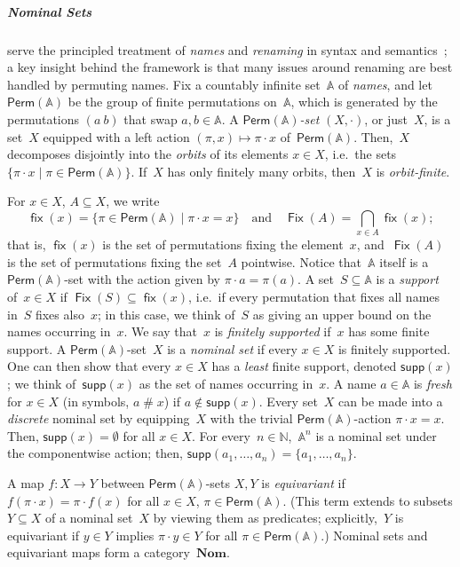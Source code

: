 \documentclass[a4paper,UKenglish,cleveref,thm-restate,numberwithinsect,final]{lipics-v2021}
\newcommand{\Perm}{\mathsf{Perm}(\Names)}
\newcommand{\Names}{\mathbb{A}}
\newcommand{\fresh}{\mathbin{\#}}
\newcommand{\supp}{\mathsf{supp}}
\newcommand{\fix}{\mathop{\mathsf{fix}}}
\newcommand{\Fix}{\mathop{\mathsf{Fix}}}
\theoremstyle{plain}
\numberwithin{equation}{section}
\newcommand{\Nat}{{\mathbb{N}}}
\newcommand{\+}[1]{\mathcal{#1}\xspace}
\newcommand{\Nom}{\mathbf{Nom}}
\theoremstyle{definition}
\begin{document}
\subparagraph*{Nominal Sets} serve the principled treatment of
\emph{names} and \emph{renaming} in syntax and
semantics~\cite{Pitts13}; a key insight behind the framework is that many
issues around renaming are best handled by permuting names. Fix a
countably infinite set~$\Names$ of \emph{names}, and let~$\Perm$ be
the group of finite permutations on~$\Names$, which is generated by the permutations $(a\ b)$ that
swap $a,b\in\Names$. A \emph{$\Perm$-set} $(X,{\cdot})$, or just~$X$,
is a set~$X$ equipped with a left action $(\pi,x)\mapsto \pi\cdot x$
of~$\Perm$. Then,~$X$ decomposes disjointly into the \emph{orbits} of
its elements $x\in X$, i.e.~the sets $\{\pi\cdot x\mid\pi\in
\Perm\}$. If~$X$ has only finitely many orbits, then~$X$ is
\emph{orbit-finite}.

For $x\in X$, $A\subseteq X$,
we write
\begin{equation*}\textstyle
  \fix(x)=\{\pi\in \Perm\mid \pi\cdot x=x\}\quad\text{and}\quad
  \Fix(A)=\bigcap_{x\in A}\fix(x);
\end{equation*}
that is, $\fix(x)$ is the set of permutations fixing the element~$x$,
and~$\Fix(A)$ is the set of permutations fixing the set~$A$ pointwise.
Notice that~$\Names$ itself is a $\Perm$-set with the action given by
$\pi\cdot a=\pi(a)$. A set~$S\subseteq\Names$ is a \emph{support}
of~$x\in X$ if $\Fix(S)\subseteq\fix(x)$, i.e.~if every permutation
that fixes all names in~$S$ fixes also~$x$; in this case, we think
of~$S$ as giving an upper bound on the names occurring in~$x$. We say
that~$x$ is \emph{finitely supported} if~$x$ has some finite support.
A $\Perm$-set~$X$ is a \emph{nominal set} if every $x\in X$ is
finitely supported. One can then show that every $x\in X$ has a
\emph{least} finite support, denoted $\supp(x)$; we think
of~$\supp(x)$ as the set of names occurring in~$x$. A name
$a\in\Names$ is \emph{fresh} for $x\in X$ (in symbols, $a\fresh x$) if
$a\notin\supp(x)$. Every set~$X$ can be made into a \emph{discrete}
nominal set by equipping~$X$ with the trivial $\Perm$-action
$\pi\cdot x=x$. Then, $\supp(x)=\emptyset$ for all $x\in X$. For
every~$n\in\Nat$,~$\Names^n$ is a nominal set under the componentwise
action; then, $\supp(a_1,\dots,a_n)=\{a_1,\dots,a_n\}$.

A map $f\colon X\to Y$ between $\Perm$-sets $X,Y$ is
\emph{equivariant} if $f(\pi\cdot x)=\pi\cdot f(x)$ for all $x\in X$,
$\pi\in \Perm$. (This term extends to subsets $Y\subseteq X$ of a
nominal set~$X$ by viewing them as predicates; explicitly,~$Y$ is
equivariant if $y\in Y$ implies $\pi\cdot y\in Y$ for all
$\pi\in \Perm$.) Nominal sets and equivariant maps form a
category~$\Nom$.
\end{document}
